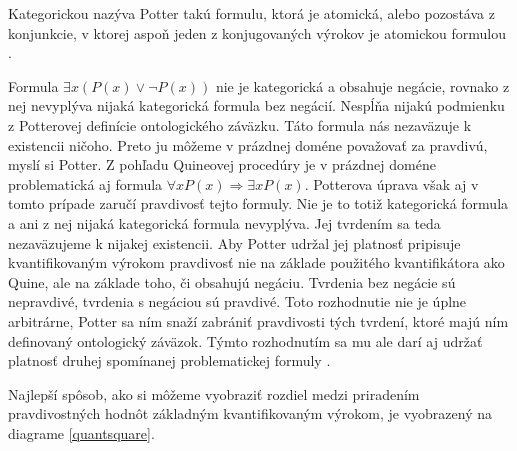 \documentclass[12pt, letterpaper]{article}
\begin{document}
\noindent Kategorickou nazýva Potter takú formulu, ktorá je atomická, alebo pozostáva z konjunkcie, v ktorej aspoň jeden z konjugovaných výrokov je atomickou formulou \parencites[351]{englebretsen}[54]{potter}.\par 
Formula $\exists x (P(x) \lor \neg P(x))$ nie je kategorická a obsahuje negácie, rovnako z nej nevyplýva nijaká kategorická formula bez negácií. Nespĺňa nijakú podmienku z Potterovej definície ontologického záväzku. Táto formula nás nezaväzuje k existencii ničoho. Preto ju môžeme v prázdnej doméne považovať za pravdivú, myslí si Potter. 
Z pohľadu Quineovej procedúry je v prázdnej doméne problematická aj formula $\forall x P(x) \Rightarrow \exists x P(x)$. Potterova úprava však aj v tomto prípade zaručí pravdivosť tejto formuly. Nie je to totiž kategorická formula a ani z nej nijaká kategorická formula nevyplýva. Jej tvrdením sa teda nezaväzujeme k nijakej existencii. Aby Potter udržal jej platnosť pripisuje kvantifikovaným výrokom pravdivosť nie na základe použitého kvantifikátora ako Quine, ale na základe toho, či obsahujú negáciu. Tvrdenia bez negácie sú nepravdivé, tvrdenia s negáciou sú pravdivé. Toto rozhodnutie nie je úplne arbitrárne, Potter sa ním snaží zabrániť pravdivosti tých tvrdení, ktoré majú ním definovaný ontologický záväzok. Týmto rozhodnutím sa mu ale darí aj udržať platnosť druhej spomínanej problematickej formuly \parencites[351--352]{englebretsen}[55]{potter}.\par
Najlepší spôsob, ako si môžeme vyobraziť rozdiel medzi priradením pravdivostných hodnôt základným kvantifikovaným výrokom, je vyobrazený na diagrame \ref{quantsquare}.
\end{document}
